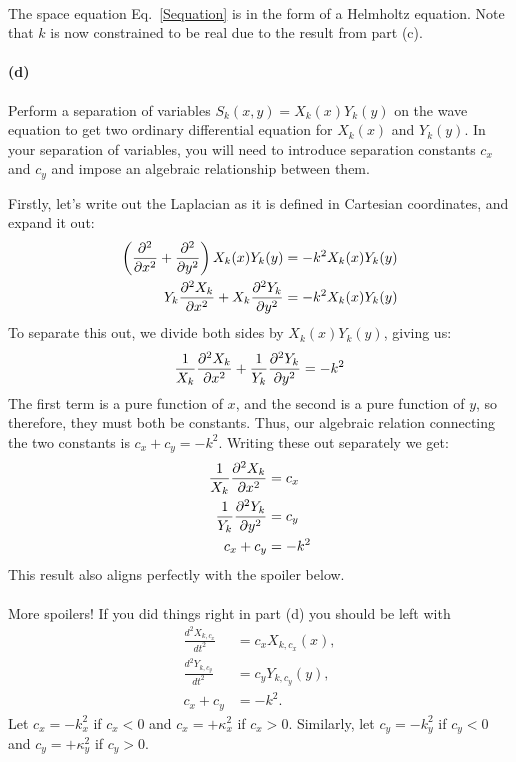 \documentclass{article}
\begin{document}
\paragraph{}
The space equation Eq.~\ref{Sequation} is in the form of a Helmholtz equation.  Note that $k$ is now constrained to be real due to the result from part (c).	

\paragraph{(d)}
Perform a separation of variables $S_{k}(x,y) = X_{k}(x)Y_{k}(y)$ on the wave equation to get two ordinary differential equation for $X_{k}(x)$ and $Y_{k}(y)$.  
In your separation of variables, you will need to introduce separation constants $c_{x}$ and $c_{y}$ and impose an algebraic relationship between them.

\begin{solution}
	Firstly, let's write out the Laplacian as it is defined in Cartesian coordinates, and expand
	it out:
	\begin{align*}
		\left( \pdv[2]{x} + \pdv[2]{y} \right) X_k(x) Y_k(y) &= -k^2 X_k(x) Y_k(y) \\
		Y_k\pdv[2]{X_k}{x} + X_k \pdv[2]{Y_k}{y} &=  -k^2 X_k(x) Y_k(y) 
	\end{align*}
	To separate this out, we divide both sides by $X_k(x)Y_k(y)$, giving us:
	\[
		\frac{1}{X_k}\pdv[2]{X_k}{x} + \frac{1}{Y_k}\pdv[2]{Y_k}{y} = -k^2
	\] 
	The first term is a pure function of $x$, and the second is a pure function of $y$, so therefore, 
	they must both be constants. Thus, our algebraic relation connecting the two constants 
	is $c_x + c_y = -k^2$. Writing these out separately we get:
	\begin{align*}
		\frac{1}{X_k}\pdv[2]{X_k}{x} &= c_x\\
		\frac{1}{Y_k}\pdv[2]{Y_k}{y} &= c_y \\
		c_x + c_y &=  -k^2 
	\end{align*} 
	This result also aligns perfectly with the spoiler below.
\end{solution}

\phline
\paragraph{}
More spoilers!  If you did things right in part (d) you should be left with
	\begin{align}
		\frac{d^{2}X_{k,c_{x}}}{dt^{2}} &= c_{x}X_{k,c_{x}}(x),		\label{Xequation}\\	
		\frac{d^{2}Y_{k,c_{y}}}{dt^{2}} &= c_{y}Y_{k,c_{y}}(y),		\label{Yequation}\\	
		c_{x}+c_{y}&=-k^{2}.						\label{Relation}
	\end{align}
Let $c_{x}=-k_{x}^{2}$ if $c_{x}<0$ and $c_{x}=+\kappa_{x}^{2}$ if $c_{x}>0$.  Similarly, let $c_{y}=-k_{y}^{2}$ if $c_{y}<0$ and $c_{y}=+\kappa_{y}^{2}$ if $c_{y}>0$.
\end{document}
